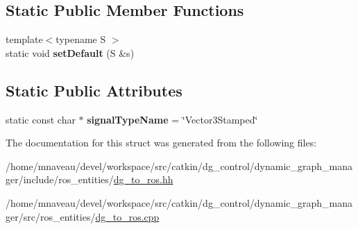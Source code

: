 \subsection*{Static Public Member Functions}
\begin{DoxyCompactItemize}
\item 
{\footnotesize template$<$typename S $>$ }\\static void {\bfseries set\+Default} (S \&s)\hypertarget{structdynamic__graph_1_1DgToRos_3_01std_1_1pair_3_01specific_1_1Vector3_00_01Vector_01_4_01_4_a85e4b5b1a35534adb8584c723bf93a7c}{}\label{structdynamic__graph_1_1DgToRos_3_01std_1_1pair_3_01specific_1_1Vector3_00_01Vector_01_4_01_4_a85e4b5b1a35534adb8584c723bf93a7c}

\end{DoxyCompactItemize}
\subsection*{Static Public Attributes}
\begin{DoxyCompactItemize}
\item 
static const char $\ast$ {\bfseries signal\+Type\+Name} = \char`\"{}Vector3\+Stamped\char`\"{}\hypertarget{structdynamic__graph_1_1DgToRos_3_01std_1_1pair_3_01specific_1_1Vector3_00_01Vector_01_4_01_4_a39142c1dac9d7e9aab9230dce9a6fd79}{}\label{structdynamic__graph_1_1DgToRos_3_01std_1_1pair_3_01specific_1_1Vector3_00_01Vector_01_4_01_4_a39142c1dac9d7e9aab9230dce9a6fd79}

\end{DoxyCompactItemize}


The documentation for this struct was generated from the following files\+:\begin{DoxyCompactItemize}
\item 
/home/mnaveau/devel/workspace/src/catkin/dg\+\_\+control/dynamic\+\_\+graph\+\_\+manager/include/ros\+\_\+entities/\hyperlink{dg__to__ros_8hh}{dg\+\_\+to\+\_\+ros.\+hh}\item 
/home/mnaveau/devel/workspace/src/catkin/dg\+\_\+control/dynamic\+\_\+graph\+\_\+manager/src/ros\+\_\+entities/\hyperlink{dg__to__ros_8cpp}{dg\+\_\+to\+\_\+ros.\+cpp}\end{DoxyCompactItemize}
